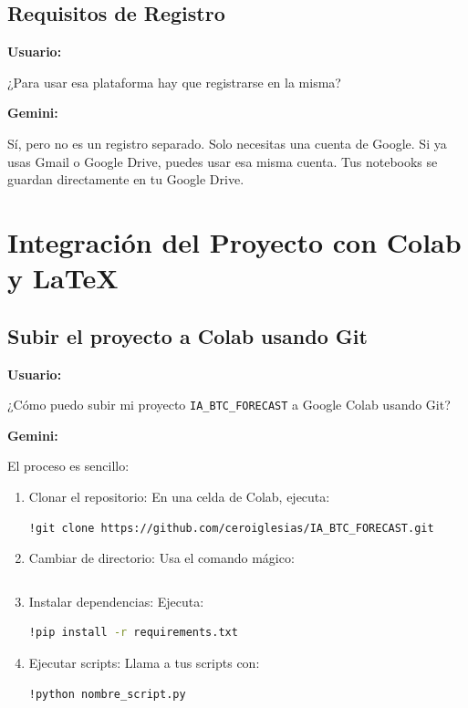 \documentclass[12pt, a4paper]{article}
\newenvironment{usuario}{\par\noindent\textbf{Usuario:}\itshape\par\ignorespaces}{\par}
\newenvironment{gemini}{\par\noindent\textbf{Gemini:}\par\ignorespaces}{\par}
\begin{document}
\subsection{Requisitos de Registro}

\begin{usuario}
¿Para usar esa plataforma hay que registrarse en la misma?
\end{usuario}

\begin{gemini}
Sí, pero no es un registro separado. Solo necesitas una cuenta de Google. Si ya usas Gmail o Google Drive, puedes usar esa misma cuenta. Tus notebooks se guardan directamente en tu Google Drive.
\end{gemini}

\section{Integración del Proyecto con Colab y LaTeX}

\subsection{Subir el proyecto a Colab usando Git}

\begin{usuario}
¿Cómo puedo subir mi proyecto \texttt{IA\_BTC\_FORECAST} a Google Colab usando Git?
\end{usuario}

\begin{gemini}
El proceso es sencillo:
\begin{enumerate}
    \item Clonar el repositorio: En una celda de Colab, ejecuta:
    
    \begin{lstlisting}[language=bash]
        !git clone https://github.com/ceroiglesias/IA_BTC_FORECAST.git
    \end{lstlisting}

    \item Cambiar de directorio: Usa el comando mágico:
    \begin{lstlisting}[language=bash]
%cd IA_BTC_FORECAST
    \end{lstlisting}
    \item Instalar dependencias: Ejecuta:
    \begin{lstlisting}[language=bash]
!pip install -r requirements.txt
    \end{lstlisting}
    \item Ejecutar scripts: Llama a tus scripts con:
    \begin{lstlisting}[language=bash]
!python nombre_script.py
    \end{lstlisting}
\end{enumerate}
\end{gemini}
\end{document}
